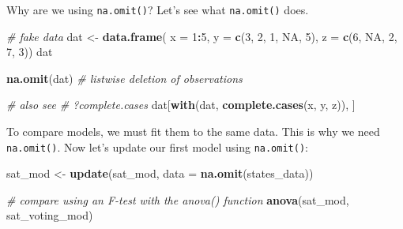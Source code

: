 \documentclass[
]{book}
\newenvironment{Shaded}{\begin{snugshade}}{\end{snugshade}}
\newcommand{\CommentTok}[1]{\textcolor[rgb]{0.56,0.35,0.01}{\textit{#1}}}
\newcommand{\DataTypeTok}[1]{\textcolor[rgb]{0.13,0.29,0.53}{#1}}
\newcommand{\DecValTok}[1]{\textcolor[rgb]{0.00,0.00,0.81}{#1}}
\newcommand{\KeywordTok}[1]{\textcolor[rgb]{0.13,0.29,0.53}{\textbf{#1}}}
\newcommand{\NormalTok}[1]{#1}
\newcommand{\OperatorTok}[1]{\textcolor[rgb]{0.81,0.36,0.00}{\textbf{#1}}}
\newcommand{\OtherTok}[1]{\textcolor[rgb]{0.56,0.35,0.01}{#1}}
\newcommand{\StringTok}[1]{\textcolor[rgb]{0.31,0.60,0.02}{#1}}
\begin{document}
\begin{Shaded}
\end{Shaded}

Why are we using \texttt{na.omit()}? Let's see what \texttt{na.omit()} does.

\begin{Shaded}
\begin{Highlighting}[]
\CommentTok{# fake data}
\NormalTok{dat <-}\StringTok{ }\KeywordTok{data.frame}\NormalTok{(}
  \DataTypeTok{x =} \DecValTok{1}\OperatorTok{:}\DecValTok{5}\NormalTok{,}
  \DataTypeTok{y =} \KeywordTok{c}\NormalTok{(}\DecValTok{3}\NormalTok{, }\DecValTok{2}\NormalTok{, }\DecValTok{1}\NormalTok{, }\OtherTok{NA}\NormalTok{, }\DecValTok{5}\NormalTok{),}
  \DataTypeTok{z =} \KeywordTok{c}\NormalTok{(}\DecValTok{6}\NormalTok{, }\OtherTok{NA}\NormalTok{, }\DecValTok{2}\NormalTok{, }\DecValTok{7}\NormalTok{, }\DecValTok{3}\NormalTok{))}
\NormalTok{dat}

\KeywordTok{na.omit}\NormalTok{(dat) }\CommentTok{# listwise deletion of observations}

\CommentTok{# also see}
\CommentTok{# ?complete.cases}
\NormalTok{dat[}\KeywordTok{with}\NormalTok{(dat, }\KeywordTok{complete.cases}\NormalTok{(x, y, z)), ]}
\end{Highlighting}
\end{Shaded}

To compare models, we must fit them to the same data. This is why we need \texttt{na.omit()}.
Now let's update our first model using \texttt{na.omit()}:

\begin{Shaded}
\begin{Highlighting}[]
\NormalTok{  sat_mod <-}\StringTok{ }\KeywordTok{update}\NormalTok{(sat_mod, }\DataTypeTok{data =} \KeywordTok{na.omit}\NormalTok{(states_data))}

  \CommentTok{# compare using an F-test with the anova() function}
  \KeywordTok{anova}\NormalTok{(sat_mod, sat_voting_mod)}
\end{Highlighting}
\end{Shaded}
\end{document}
